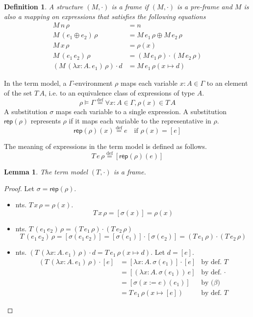 \documentclass{tufte-handout}
\newcommand{\defeq}[0]{\overset{\mathrm{def}}{=}}
\newcommand{\LAM}[1]{\lambda #1.\,}
\newcommand{\APP}[0]{\,}
\newcommand{\of}[0]{\!:\!}
\newcommand{\by}[0]{\!:=\!}
\newcommand{\ext}[3]{#3(#1{\mapsto}#2)}
\newtheorem{lemma}[theorem]{Lemma}
\newtheorem{definition}{Definition}%
\begin{document}
\begin{definition}
A structure $(M,\cdot)$ is a \emph{frame} if $(M,\cdot)$ is a
pre-frame and $M$ is also a mapping on expressions that satisfies the
following equations
\begin{align*}
  M\,n\,\rho &= n \\
  M\,(e_1 \oplus e_2)\,\rho &= M\,e_1\,\rho \oplus M\,e_2\,\rho \\
  M\,x\,\rho &= \rho(x) \\
  M\,(e_1\APP e_2)\,\rho &= (M\,e_1\,\rho) \cdot (M\,e_2\,\rho) \\
  (M\,(\LAM{x\of A} e_1)\,\rho) \cdot d &=
    M\,e_1\,\ext{x}{d}{\rho}
\end{align*}
\end{definition}

In the term model, a $\Gamma$-environment $\rho$ maps each variable $x
: A \in \Gamma$ to an element of the set $T\,A$, i.e. to an
equivalence class of expressions of type $A$.
\[
  \rho \models \Gamma \defeq \forall x:A \in \Gamma, \rho(x) \in T\,A
\]
A substitution $\sigma$ maps each variable to a single expression. A
substitution $\mathsf{rep}(\rho)$ represents $\rho$ if it maps each
variable to the representative in $\rho$.
\[
  \mathsf{rep}(\rho)(x) \defeq e \quad \text{if } \rho(x) = [e]
\]

The meaning of expressions in the term model is defined as follows.
\[
  T\,e\,\rho \defeq [\mathsf{rep}(\rho)(e)]
\]


\begin{lemma}
  \label{lem:term-frame}
  The term model $(T,\cdot)$ is a frame.
\end{lemma}
\begin{proof} Let $\sigma = \mathsf{rep}(\rho)$.
  \begin{itemize}
  \item nts. $T\,x\,\rho = \rho(x)$.
    \[
     T\,x\,\rho = [\sigma(x)] = \rho(x)
    \]
    
  \item nts. $T\,(e_1\APP e_2)\,\rho = (T\,e_1\,\rho) \cdot (T\,e_2\,\rho)$
    \[
    T\,(e_1\APP e_2)\,\rho
    = [\sigma(e_1\APP e_2)]
    = [\sigma(e_1)] \cdot [\sigma(e_2)]
    = (T\,e_1\,\rho ) \cdot (T\,e_2\,\rho)
    \]

  \item nts. $(T\,(\LAM{x\of A} e_1)\,\rho) \cdot d =
    T\,e_1\,\ext{x}{d}{\rho}$. Let $d=[e]$.
    \begin{align*}
    (T\,(\LAM{x\of A} e_1)\,\rho) \cdot [e]
    &= [\LAM{x\of A}\sigma(e_1)] \cdot [e] & \text{by def. $T$}\\
    &= [(\LAM{x\of A}\sigma(e_1)) \APP e] & \text{by def. $\cdot$}\\
    &= [\sigma(x\by e)(e_1)] & \text{by ($\beta$)}\\
    &= T\,e_1\,\ext{x}{[e]}{\rho} & \text{by def. $T$}
    \end{align*}
    
  \end{itemize}
  
\end{proof}
\end{document}

